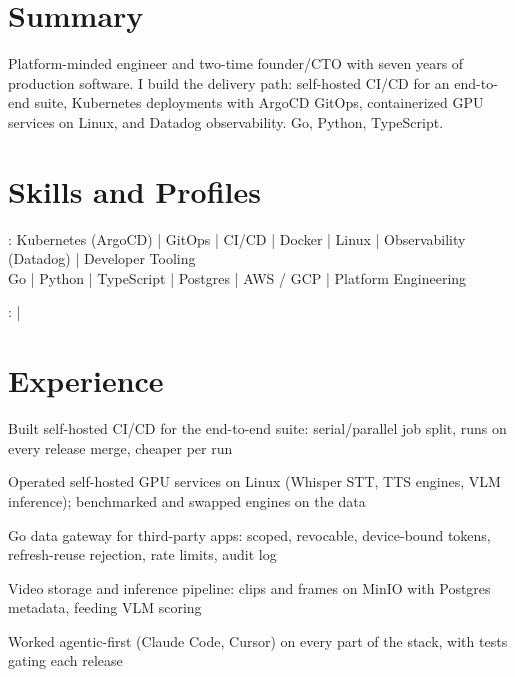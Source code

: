 \documentclass[print]{jack-resume}
\begin{document}
\pagecolor{darkmodeBackground}


\begin{minipage}[t][1cm][t]{.03\textwidth}
    \hfill
\end{minipage}

\section{Summary}
Platform-minded engineer and two-time founder/CTO with seven years of production software. I build the delivery path: self-hosted CI/CD for an end-to-end suite, Kubernetes deployments with ArgoCD GitOps, containerized GPU services on Linux, and Datadog observability. Go, Python, TypeScript.
\sectionsep

\section{Skills and Profiles}
:
Kubernetes (ArgoCD) \hfill | \hfill
GitOps \hfill | \hfill
CI/CD \hfill | \hfill
Docker \hfill | \hfill
Linux \hfill | \hfill
Observability (Datadog) \hfill | \hfill
Developer Tooling \\
\hspace{1.0cm} Go \hfill | \hfill
Python \hfill | \hfill
TypeScript \hfill | \hfill
Postgres \hfill | \hfill
AWS / GCP \hfill | \hfill
Platform Engineering \\

\raggedright{
    :
      \href{https://www.linkedin.com/in/jack-sturtevant/}{ \ExternalLink} |
     \href{https://github.com/jacksturt}{ \ExternalLink}}

\section{Experience}

\begin{tightemize}
    \item Built self-hosted CI/CD for the end-to-end suite: serial/parallel job split, runs on every release merge, cheaper per run
    \item Operated self-hosted GPU services on Linux (Whisper STT, TTS engines, VLM inference); benchmarked and swapped engines on the data
    \item Go data gateway for third-party apps: scoped, revocable, device-bound tokens, refresh-reuse rejection, rate limits, audit log
    \item Video storage and inference pipeline: clips and frames on MinIO with Postgres metadata, feeding VLM scoring
    \item Worked agentic-first (Claude Code, Cursor) on every part of the stack, with tests gating each release
\end{tightemize}
\sectionsep
\end{document}
